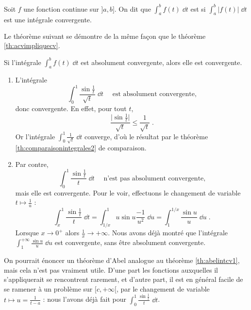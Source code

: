 \documentclass[class=report,crop=false]{standalone}
\begin{document}
\begin{definition}
Soit $f$ une fonction continue sur $]a,b]$. On dit que
  $\int_a^b f(t)\;\dd t$ est  si 
$\int_a^b \big|f(t)\big|\;\dd t$ est une intégrale convergente.
\end{definition}

Le théorème suivant se démontre de la même fa\c{c}on que le théorème \ref{th:acvimpliquecv}.

\begin{theoreme}
Si l'intégrale $\int_a^b f(t)\;\dd t$ est absolument convergente,
alors elle est convergente. 
\end{theoreme}


\begin{exemple}
\begin{enumerate}
  \item L'intégrale
$$\int_0^1 \frac{\sin\frac1t}{\sqrt{t}}\;\dd t\quad\text{ est absolument convergente,}$$
donc convergente. En effet, pour tout $t$,
$$\frac{\big|\sin\frac1t\big|}{\sqrt{t}}\le \frac{1}{\sqrt{t}}\;.$$
Or l'intégrale $\int_0^1 \frac{1}{\sqrt{t}}\;\dd t$
converge, d'où le résultat par le théorème \ref{th:comparaisonintegrales2} de comparaison.
  
  \item Par contre, 
$$
\int_0^1 \frac{\sin\frac1t}{t}\;\dd t\quad\text{ n'est pas absolument convergente,}
$$
mais elle est convergente.
Pour le voir, effectuons le changement de variable $t\mapsto \frac1u$ :
$$
\int_x^1 \frac{\sin\frac1t}{t}\;\dd t = 
\int_{1/x}^1 u\sin u\frac{-1}{u^2}\;\dd u = 
\int_1^{1/x} \frac{\sin u}{u}\;\dd u\;.
$$
Lorsque $x \to 0^+$ alors $\frac1x \to +\infty$.
Nous avons déjà montré que l'intégrale 
$\int_1^{+\infty} \frac{\sin u}{u}\;\dd u$ est convergente, sans être
absolument convergente. 
\end{enumerate}
  
\end{exemple}

\bigskip

On pourrait énoncer un théorème d'Abel analogue au théorème
\ref{th:abelintcv1}, mais cela n'est pas vraiment utile. D'une part
les fonctions auxquelles il s'appliquerait se rencontrent rarement,
et d'autre part, il est en général facile de se ramener à un
problème sur $[c,+\infty[$, par le changement de variable 
$t\mapsto u=\frac{1}{t-a}$ : nous l'avons déjà fait
pour $\int_0^1 \frac{\sin \frac 1t}{t}\;\dd t$.   


\end{document}
